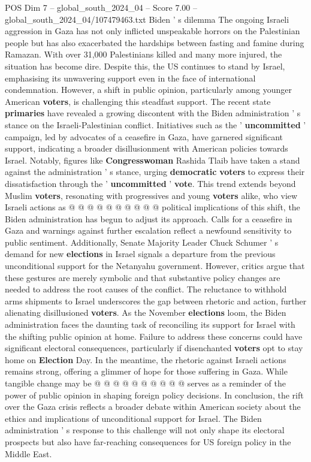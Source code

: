 \begin{textsample}{POS Dim 7 – global\_south\_2024\_04 – Score 7.00 – global\_south\_2024\_04/107479463.txt}  \label{ex:f7_pos_168}
Biden ' s dilemma The ongoing Israeli aggression in Gaza has not only inflicted unspeakable horrors on the Palestinian people but has also exacerbated the hardships between fasting and famine during Ramazan.
With over 31,000 Palestinians killed and many more injured, the situation has become dire.
Despite this, the US continues to stand by Israel, emphasising its unwavering support even in the face of international condemnation.
However, a shift in public opinion, particularly among younger American \textbf{voters}, is challenging this steadfast support.
The recent state \textbf{primaries} have revealed a growing discontent with the Biden administration ' s stance on the Israeli-Palestinian conflict.
Initiatives such as the ' \textbf{uncommitted} ' campaign, led by advocates of a ceasefire in Gaza, have garnered significant support, indicating a broader disillusionment with American policies towards Israel.
Notably, figures like \textbf{Congresswoman} Rashida Tlaib have taken a stand against the administration ' s stance, urging \textbf{democratic} \textbf{voters} to express their dissatisfaction through the ' \textbf{uncommitted} ' \textbf{vote}.
This trend extends beyond Muslim \textbf{voters}, resonating with progressives and young \textbf{voters} alike, who view Israeli actions as @ @ @ @ @ @ @ @ @ @ political implications of this shift, the Biden administration has begun to adjust its approach.
Calls for a ceasefire in Gaza and warnings against further escalation reflect a newfound sensitivity to public sentiment.
Additionally, Senate Majority Leader Chuck Schumer ' s demand for new \textbf{elections} in Israel signals a departure from the previous unconditional support for the Netanyahu government.
However, critics argue that these gestures are merely symbolic and that substantive policy changes are needed to address the root causes of the conflict.
The reluctance to withhold arms shipments to Israel underscores the gap between rhetoric and action, further alienating disillusioned \textbf{voters}.
As the November \textbf{elections} loom, the Biden administration faces the daunting task of reconciling its support for Israel with the shifting public opinion at home.
Failure to address these concerns could have significant electoral consequences, particularly if disenchanted \textbf{voters} opt to stay home on \textbf{Election} Day.
In the meantime, the rhetoric against Israeli actions remains strong, offering a glimmer of hope for those suffering in Gaza.
While tangible change may be @ @ @ @ @ @ @ @ @ @ serves as a reminder of the power of public opinion in shaping foreign policy decisions.
In conclusion, the rift over the Gaza crisis reflects a broader debate within American society about the ethics and implications of unconditional support for Israel.
The Biden administration ' s response to this challenge will not only shape its electoral prospects but also have far-reaching consequences for US foreign policy in the Middle East.

\end{textsample}
